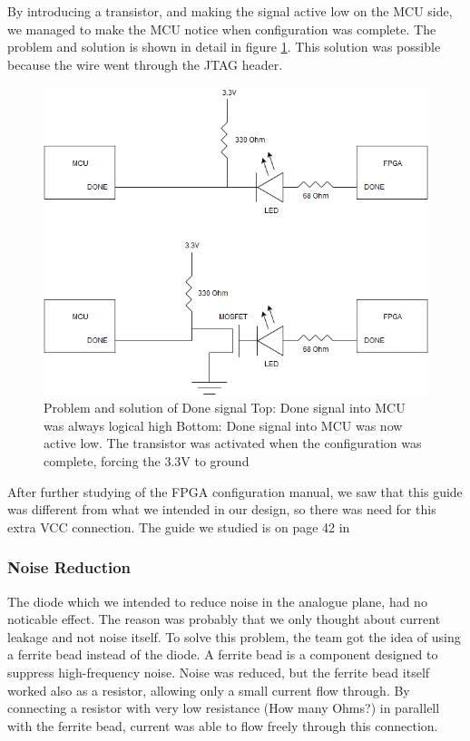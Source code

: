 By introducing a transistor, and making the signal active low on the MCU side, we managed to make the MCU notice when configuration was complete.
The problem and solution is shown in detail in figure \ref{fig:Done Issue}.
This solution was possible because the wire went through the JTAG header.

\begin{figure}[h!]
\centering
\includegraphics[scale=0.5]{images/Done_Signal_Issue.png}
\caption{Problem and solution of Done signal
         \newline
         Top: Done signal into MCU was always logical high
         \newline
         Bottom: Done signal into MCU was now active low. The transistor was activated when the configuration was complete, forcing the 3.3V to ground}
\label{fig:Done Issue}
\end{figure}

After further studying of the FPGA configuration manual, we saw that this guide was different from what we intended in our design, so there was need for this extra VCC connection. The guide we studied is on page 42 in \cite{fpga-configuration}

\subsubsection{Noise Reduction}
The diode which we intended to reduce noise in the analogue plane, had no noticable effect. The reason was probably that we only thought about current leakage and not noise itself. To solve this problem, the team got the idea of using a ferrite bead instead of the diode. A ferrite bead is a component designed to suppress high-frequency noise. 
\newline
Noise was reduced, but the ferrite bead itself worked also as a resistor, allowing only a small current flow through. By connecting a resistor with very low resistance (How many Ohms?) in parallell with the ferrite bead, current was able to flow freely through this connection.


